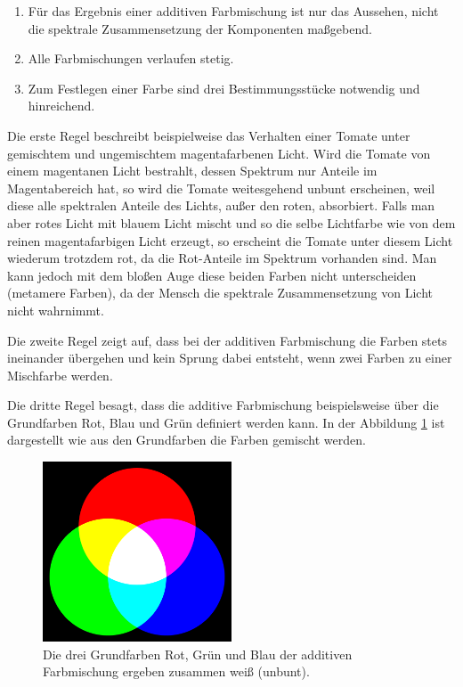 \begin{enumerate}\setlength{\itemsep}{0ex}
\item Für das Ergebnis einer additiven Farbmischung ist nur das Aussehen, nicht die spektrale Zusammensetzung der Komponenten maßgebend.
\item Alle Farbmischungen verlaufen stetig.
\item Zum Festlegen einer Farbe sind drei Bestimmungsstücke notwendig und hinreichend.
\end{enumerate}

Die erste Regel beschreibt beispielweise das Verhalten einer Tomate unter gemischtem und ungemischtem magentafarbenen Licht. Wird die Tomate von einem magentanen Licht bestrahlt, dessen Spektrum nur Anteile im Magentabereich hat, so wird die Tomate weitesgehend unbunt erscheinen, weil diese alle spektralen Anteile des Lichts, außer den roten, absorbiert. Falls man aber rotes Licht mit blauem Licht mischt und so die selbe Lichtfarbe wie von dem reinen magentafarbigen Licht erzeugt, so erscheint die Tomate unter diesem Licht wiederum trotzdem rot, da die Rot-Anteile im Spektrum vorhanden sind. Man kann jedoch mit dem bloßen Auge diese beiden Farben nicht unterscheiden (metamere Farben), da der Mensch die spektrale Zusammensetzung von Licht nicht wahrnimmt. 

Die zweite Regel zeigt auf, dass bei der additiven Farbmischung die Farben stets ineinander übergehen und kein Sprung dabei entsteht, wenn zwei Farben zu einer Mischfarbe werden.

Die dritte Regel besagt, dass die additive Farbmischung beispielsweise über die Grundfarben Rot, Blau und Grün definiert werden kann. In der Abbildung   \ref{b_farben+} ist dargestellt wie aus den Grundfarben die Farben gemischt werden.

\begin{figure}[H]     %
\centering
\includegraphics[width=0.5\textwidth]{bilder/farben+} 
\caption {Die drei Grundfarben Rot, Grün und Blau der additiven Farbmischung ergeben zusammen weiß (unbunt).\protect\footnotemark}\label{b_farben+}
\end{figure}

